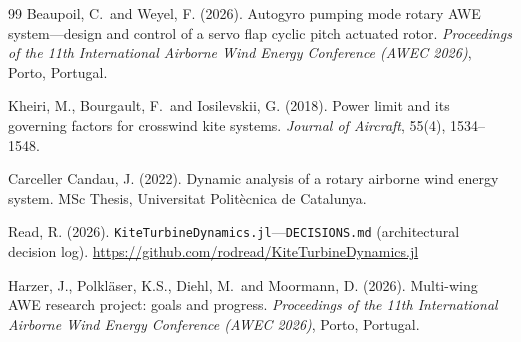 \documentclass[11pt,a4paper]{article}
\begin{document}
\begin{thebibliography}{99}
Beaupoil, C.\ and Weyel, F. (2026).
Autogyro pumping mode rotary AWE system---design and control of a servo flap cyclic pitch actuated rotor.
\emph{Proceedings of the 11th International Airborne Wind Energy Conference (AWEC 2026)}, Porto, Portugal.

Kheiri, M., Bourgault, F.\ and Iosilevskii, G. (2018).
Power limit and its governing factors for crosswind kite systems.
\emph{Journal of Aircraft}, 55(4), 1534--1548.

Carceller Candau, J. (2022).
Dynamic analysis of a rotary airborne wind energy system.
MSc Thesis, Universitat Polit\`ecnica de Catalunya.

Read, R. (2026).
\texttt{KiteTurbineDynamics.jl}---\texttt{DECISIONS.md} (architectural decision log).
\url{https://github.com/rodread/KiteTurbineDynamics.jl}

Harzer, J., Polkl\"aser, K.S., Diehl, M.\ and Moormann, D. (2026).
Multi-wing AWE research project: goals and progress.
\emph{Proceedings of the 11th International Airborne Wind Energy Conference (AWEC 2026)}, Porto, Portugal.

\end{thebibliography}
\end{document}
